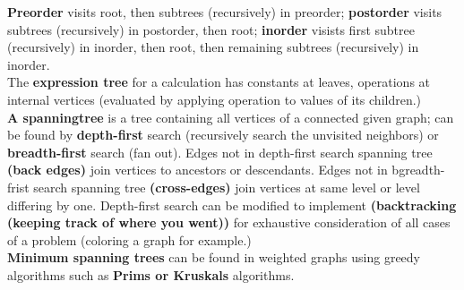 \documentclass[12pt]{article}
\begin{document}
\textbf{Preorder} visits root, then subtrees (recursively) in preorder; \textbf{postorder} visits subtrees (recursively) in postorder, then root; \textbf{inorder} visists first subtree (recursively) in inorder, then root, then remaining subtrees (recursively) in inorder. \\
The \textbf{expression tree} for a calculation has constants at leaves, operations at internal vertices (evaluated by applying operation to values of its children.) \\
\textbf{A spanningtree} is a tree containing all vertices of a connected given graph; can be found by \textbf{depth-first} search (recursively search the unvisited neighbors) or \textbf{breadth-first} search (fan out). Edges not in depth-first search spanning tree \textbf{(back edges)} join vertices to ancestors or descendants. Edges not in bgreadth-frist search spanning tree \textbf{(cross-edges)} join vertices at same level or level differing by one. Depth-first search can be modified to implement \textbf{(backtracking (keeping track of where you went))} for exhaustive consideration of all cases of a problem (coloring a graph for example.) \\
\textbf{Minimum spanning trees} can be found in weighted graphs using greedy algorithms such as \textbf{Prims or Kruskals} algorithms. \\
\end{document}
